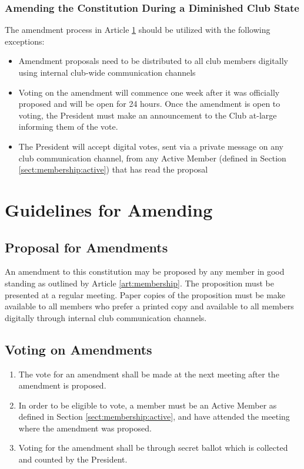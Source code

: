 \documentclass[english,11pt]{article}
\begin{document}
\subsubsection{Amending the Constitution During a Diminished Club State} \label{subsect:reduced:amending}
The amendment process in Article \ref{art:amending} should be utilized with the following exceptions:

\begin{itemize}
    \item Amendment proposals need to be distributed to all club members digitally using internal club-wide communication channels
    \item Voting on the amendment will commence one week after it was officially proposed and will be open for 24 hours.
        Once the amendment is open to voting, the President must make an announcement to the Club at-large informing them of the vote.
    \item The President will accept digital votes, sent via a private message on any club communication channel, from any Active Member (defined in Section \ref{sect:membership:active}) that has read the proposal
\end{itemize}

\section{Guidelines for Amending} \label{art:amending}

\subsection{Proposal for Amendments} \label{sect:amending:proposal}
An amendment to this constitution may be proposed by any member in good standing as outlined by Article \ref{art:membership}.
The proposition must be presented at a regular meeting.
Paper copies of the proposition must be make available to all members who prefer a printed copy and available to all members digitally through internal club communication channels.

\subsection{Voting on Amendments}  \label{sect:amending:voting}
\begin{enumerate}[label=\Alph*.]
    \item The vote for an amendment shall be made at the next meeting after the amendment is proposed.
    \item In order to be eligible to vote, a member must be an Active Member as defined in Section \ref{sect:membership:active}, and have attended the meeting where the amendment was proposed.
    \item Voting for the amendment shall be through secret ballot which is collected and counted by the President.
\end{enumerate}
\end{document}
